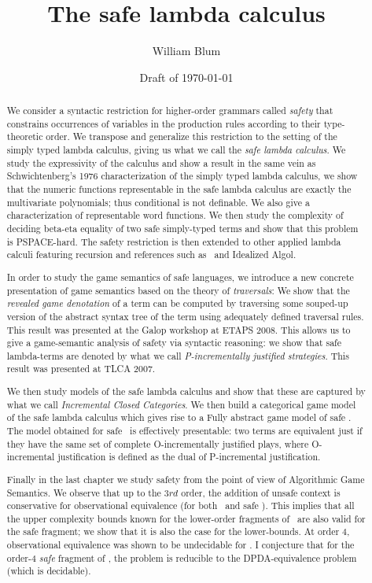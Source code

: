 \documentclass[a4paper,twoside,openright,draft]{ociamthesis}
\author{William Blum}
\title{The safe lambda calculus}
\date{Draft of \today}
\begin{document}
\maketitle

\begin{abstract}
We consider a syntactic restriction for higher-order grammars called \emph{safety}  that  constrains occurrences of variables in the production rules according to their type-theoretic order. We transpose and generalize this restriction to the setting of the simply typed lambda calculus, giving us what we call the \emph{safe lambda calculus}.  We study the expressivity of the calculus and show a result in the same vein as Schwichtenberg's 1976 characterization of the simply typed lambda calculus, we show that the numeric functions representable in the safe lambda calculus are exactly the
multivariate polynomials; thus conditional is not definable. We
also give a characterization of representable word functions.
We then study the complexity of deciding beta-eta equality of two safe simply-typed terms and show that this problem is PSPACE-hard. The safety restriction is then extended to other applied lambda calculi featuring recursion and references such as \pcf\ and Idealized Algol.

In order to study the game semantics of safe languages, we introduce a new concrete presentation of game semantics based on the theory of \emph{traversals}: We show that the \emph{revealed game denotation} of a term can be computed by traversing some souped-up version of the abstract syntax tree of the term using adequately defined traversal rules. This result was presented at the Galop workshop at ETAPS 2008. This allows us to give a game-semantic analysis of safety via syntactic reasoning: we show that safe lambda-terms are denoted by what we call \emph{P-incrementally justified strategies}. This result was presented at TLCA 2007.

We then study models of the safe lambda calculus and show that these are captured by what we call \emph{Incremental Closed Categories}. We then build a categorical game model of the safe lambda calculus which gives rise to a Fully abstract game model of safe \ialgol.
The model obtained for safe \ialgol\ is effectively presentable: two terms are equivalent just if they have the same set of complete O-incrementally justified plays, where O-incremental justification is defined as the dual of P-incremental justification.

Finally in the last chapter we study safety from the point of view of Algorithmic Game Semantics.  We observe that up to the $3rd$ order, the addition of unsafe context is conservative for observational equivalence (for both \ialgol\ and safe \ialgol). This implies that all the upper complexity bounds known for the lower-order fragments of \ialgol\ are also valid for the safe fragment; we show that it is also the case for the lower-bounds. At order $4$, observational equivalence was shown to be undecidable for \ialgol.
I conjecture that for the order-$4$ \emph{safe} fragment of \ialgol, the problem is reducible to the DPDA-equivalence problem (which is decidable).


\end{abstract}
\end{document}
